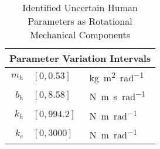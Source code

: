 \begin{table}%
\centering
\begin{tabular}{r l l}\toprule
\multicolumn{3}{c}{Parameter Variation Intervals}\\\midrule
$m_h$ & $[0,0.53]$ &\si{\kilo\gram\meter\squared\per\radian}\\
$b_h$ & $[0,8.58]$ &\si{\newton\meter\second\per\radian}\\
$k_h$ & $[0,994.2]$ &\si{\newton\meter\per\radian}\\
$k_e$ & $[0,3000]$ &\si{\newton\meter\per\radian}\\
\bottomrule
\end{tabular}
\caption[Identified Uncertain Human Parameters as Rotational Mechanical Components]{Identified Uncertain Human Parameters as Rotational Mechanical Components}
\label{tab:app:humparam}
\end{table}

